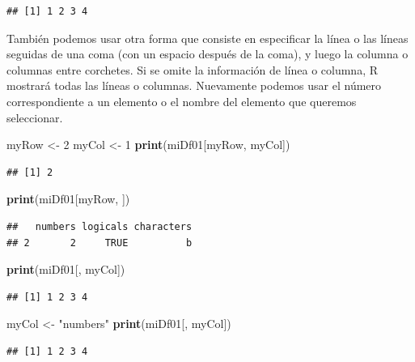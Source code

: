 \documentclass[]{book}
\newenvironment{Shaded}{\begin{snugshade}}{\end{snugshade}}
\newcommand{\KeywordTok}[1]{\textcolor[rgb]{0.13,0.29,0.53}{\textbf{#1}}}
\newcommand{\DecValTok}[1]{\textcolor[rgb]{0.00,0.00,0.81}{#1}}
\newcommand{\StringTok}[1]{\textcolor[rgb]{0.31,0.60,0.02}{#1}}
\newcommand{\NormalTok}[1]{#1}
\begin{document}
\begin{verbatim}
## [1] 1 2 3 4
\end{verbatim}

También podemos usar otra forma que consiste en especificar la línea o
las líneas seguidas de una coma (con un espacio después de la coma), y
luego la columna o columnas entre corchetes. Si se omite la información
de línea o columna, R mostrará todas las líneas o columnas. Nuevamente
podemos usar el número correspondiente a un elemento o el nombre del
elemento que queremos seleccionar.

\begin{Shaded}
\begin{Highlighting}[]
\NormalTok{myRow <-}\StringTok{ }\DecValTok{2}
\NormalTok{myCol <-}\StringTok{ }\DecValTok{1}
\KeywordTok{print}\NormalTok{(miDf01[myRow, myCol])}
\end{Highlighting}
\end{Shaded}

\begin{verbatim}
## [1] 2
\end{verbatim}

\begin{Shaded}
\begin{Highlighting}[]
\KeywordTok{print}\NormalTok{(miDf01[myRow, ])}
\end{Highlighting}
\end{Shaded}

\begin{verbatim}
##   numbers logicals characters
## 2       2     TRUE          b
\end{verbatim}

\begin{Shaded}
\begin{Highlighting}[]
\KeywordTok{print}\NormalTok{(miDf01[, myCol])}
\end{Highlighting}
\end{Shaded}

\begin{verbatim}
## [1] 1 2 3 4
\end{verbatim}

\begin{Shaded}
\begin{Highlighting}[]
\NormalTok{myCol <-}\StringTok{ "numbers"}
\KeywordTok{print}\NormalTok{(miDf01[, myCol])}
\end{Highlighting}
\end{Shaded}

\begin{verbatim}
## [1] 1 2 3 4
\end{verbatim}
\end{document}
